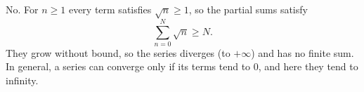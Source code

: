No. For $n\ge1$ every term satisfies $\sqrt n\ge1$, so the partial sums satisfy
\[\sum_{n=0}^{N}\sqrt n\ge N .\]
They grow without bound, so the series diverges (to $+\infty$) and has no finite sum. In general, a series can converge only if its terms tend to $0$, and here they tend to infinity.

